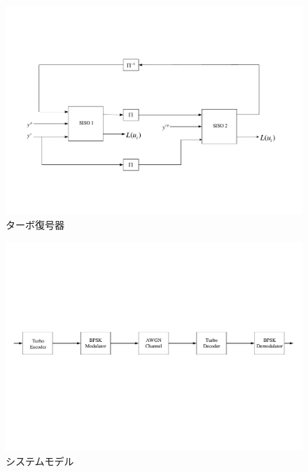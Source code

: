 \documentclass[20 pts]{article}
\begin{document}
\newpage
\begin{figure}
\includegraphics[width=15cm]{D1.pdf}
\caption{ターボ復号器}
\label{図2}
\end{figure}%

\begin{figure}
\includegraphics[width=15cm]{D2.pdf}
\caption{システムモデル}
\label{図2}
\end{figure}%
\end{document}
